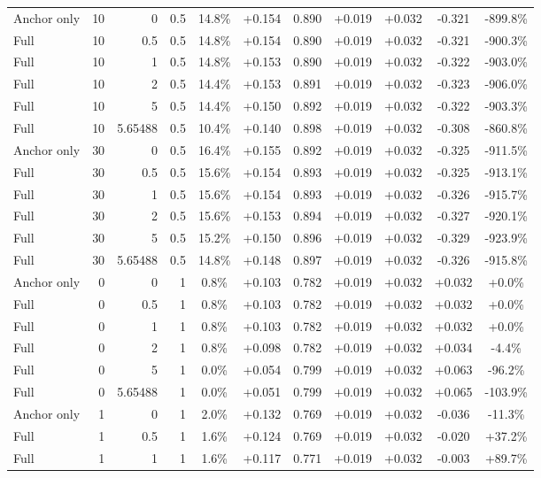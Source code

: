 \begin{table}[htbp]
\begin{tabular}{lrrrccccccc}
Anchor only & 10 & 0 & 0.5 & 14.8\% & +0.154 & 0.890 & +0.019 & +0.032 & -0.321 & -899.8\% \\
Full & 10 & 0.5 & 0.5 & 14.8\% & +0.154 & 0.890 & +0.019 & +0.032 & -0.321 & -900.3\% \\
Full & 10 & 1 & 0.5 & 14.8\% & +0.153 & 0.890 & +0.019 & +0.032 & -0.322 & -903.0\% \\
Full & 10 & 2 & 0.5 & 14.4\% & +0.153 & 0.891 & +0.019 & +0.032 & -0.323 & -906.0\% \\
Full & 10 & 5 & 0.5 & 14.4\% & +0.150 & 0.892 & +0.019 & +0.032 & -0.322 & -903.3\% \\
Full & 10 & 5.65488 & 0.5 & 10.4\% & +0.140 & 0.898 & +0.019 & +0.032 & -0.308 & -860.8\% \\
Anchor only & 30 & 0 & 0.5 & 16.4\% & +0.155 & 0.892 & +0.019 & +0.032 & -0.325 & -911.5\% \\
Full & 30 & 0.5 & 0.5 & 15.6\% & +0.154 & 0.893 & +0.019 & +0.032 & -0.325 & -913.1\% \\
Full & 30 & 1 & 0.5 & 15.6\% & +0.154 & 0.893 & +0.019 & +0.032 & -0.326 & -915.7\% \\
Full & 30 & 2 & 0.5 & 15.6\% & +0.153 & 0.894 & +0.019 & +0.032 & -0.327 & -920.1\% \\
Full & 30 & 5 & 0.5 & 15.2\% & +0.150 & 0.896 & +0.019 & +0.032 & -0.329 & -923.9\% \\
Full & 30 & 5.65488 & 0.5 & 14.8\% & +0.148 & 0.897 & +0.019 & +0.032 & -0.326 & -915.8\% \\
Anchor only & 0 & 0 & 1 & 0.8\% & +0.103 & 0.782 & +0.019 & +0.032 & +0.032 & +0.0\% \\
Full & 0 & 0.5 & 1 & 0.8\% & +0.103 & 0.782 & +0.019 & +0.032 & +0.032 & +0.0\% \\
Full & 0 & 1 & 1 & 0.8\% & +0.103 & 0.782 & +0.019 & +0.032 & +0.032 & +0.0\% \\
Full & 0 & 2 & 1 & 0.8\% & +0.098 & 0.782 & +0.019 & +0.032 & +0.034 & -4.4\% \\
Full & 0 & 5 & 1 & 0.0\% & +0.054 & 0.799 & +0.019 & +0.032 & +0.063 & -96.2\% \\
Full & 0 & 5.65488 & 1 & 0.0\% & +0.051 & 0.799 & +0.019 & +0.032 & +0.065 & -103.9\% \\
Anchor only & 1 & 0 & 1 & 2.0\% & +0.132 & 0.769 & +0.019 & +0.032 & -0.036 & -11.3\% \\
Full & 1 & 0.5 & 1 & 1.6\% & +0.124 & 0.769 & +0.019 & +0.032 & -0.020 & +37.2\% \\
Full & 1 & 1 & 1 & 1.6\% & +0.117 & 0.771 & +0.019 & +0.032 & -0.003 & +89.7\% \\

\end{tabular}
\end{table}
